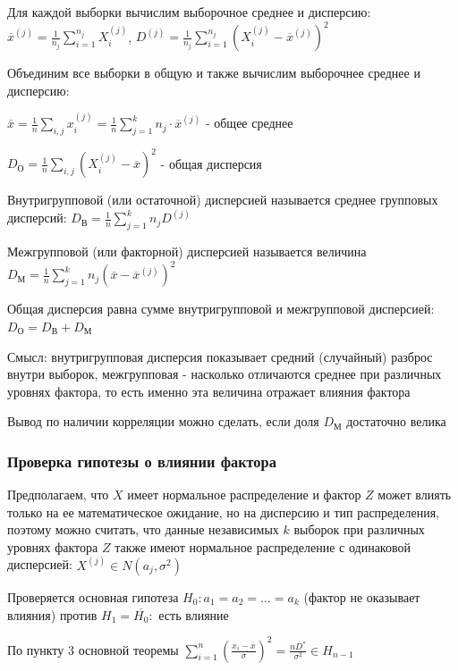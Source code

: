 \documentclass[12pt]{article}
\begin{document}
Для каждой выборки вычислим выборочное среднее и дисперсию: $\overline{x}^{(j)} = \frac{1}{n_j} \sum_{i = 1}^{n_j} X_i^{(j)}$, 
$D^{(j)} = \frac{1}{n_j} \sum_{i = 1}^{n_j} (X_i^{(j)} - \overline{x}^{(j)})^2$

Объединим все выборки в общую и также вычислим выборочнее среднее и дисперсию: 

$\overline{x} = \frac{1}{n} \sum_{i, j} x^{(j)}_i = \frac{1}{n} \sum_{j = 1}^k n_j \cdot \overline{x}^{(j)}$ - общее среднее

$D_\text{О} = \frac{1}{n} \sum_{i, j} (X^{(j)}_i - \overline{x})^2$ - общая дисперсия

\Def Внутригрупповой (или остаточной) дисперсией называется среднее групповых дисперсий: $D_{\text{В}} = \frac{1}{n} \sum_{j = 1}^k n_j D^{(j)}$

\Def Межгрупповой (или факторной) дисперсией называется величина $D_{\text{М}} = \frac{1}{n} \sum_{j = 1}^k n_j (\overline{x} - \overline{x}^{(j)})^2$

\begin{MyTheorem}
     Общая дисперсия равна сумме внутригрупповой и межгрупповой дисперсией: $D_\text{О} = D_\text{В} + D_\text{М}$
\end{MyTheorem}

Смысл: внутригрупповая дисперсия показывает средний (случайный) разброс внутри выборок, межгрупповая - насколько отличаются среднее при различных 
уровнях фактора, то есть именно эта величина отражает влияния фактора

Вывод по наличии корреляции можно сделать, если доля $D_\text{М}$ достаточно велика

\subsubsection{Проверка гипотезы о влиянии фактора}

Предполагаем, что $X$ имеет нормальное распределение и фактор $Z$ может влиять только на ее математическое ожидание, 
но на дисперсию и тип распределения, поэтому можно считать, что данные независимых $k$ выборок при различных уровнях фактора $Z$
также имеют нормальное распределение с одинаковой дисперсией: $X^{(j)} \in N(a_j, \sigma^2)$

Проверяется основная гипотеза $H_0 : a_1 = a_2 = \dots = a_k$ (фактор не оказывает влияния) против $H_1 = \overline{H_0} : $ есть влияние

По пункту 3 основной теоремы $\sum_{i = 1}^n \left(\frac{x_i - \overline{x}}{\sigma}\right)^2 = \frac{n D^*}{\sigma^2} \in H_{n - 1}$
\end{document}
